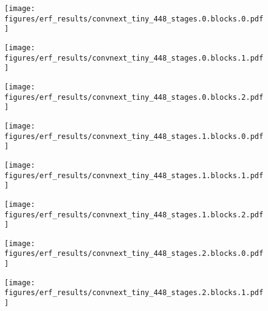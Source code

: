 \documentclass{article}
\begin{document}
\begin{figure}[tb]
  \raggedright
  \begin{minipage}[t]{0.13\hsize}
    \centering
    \texttt{[image: figures/erf\_results/convnext\_tiny\_448\_stages.0.blocks.0.pdf]}
    \label{figure:erf_convnext_448:0}
  \end{minipage}
  \begin{minipage}[t]{0.13\hsize}
    \centering
    \texttt{[image: figures/erf\_results/convnext\_tiny\_448\_stages.0.blocks.1.pdf]}
    \label{figure:erf_convnext_448:1}
  \end{minipage}
  \begin{minipage}[t]{0.13\hsize}
    \centering
    \texttt{[image: figures/erf\_results/convnext\_tiny\_448\_stages.0.blocks.2.pdf]}
    \label{figure:erf_convnext_448:2}
  \end{minipage}
  \begin{minipage}[t]{0.13\hsize}
    \centering
    \texttt{[image: figures/erf\_results/convnext\_tiny\_448\_stages.1.blocks.0.pdf]}
    \label{figure:erf_convnext_448:3}
  \end{minipage}
  \begin{minipage}[t]{0.13\hsize}
    \centering
    \texttt{[image: figures/erf\_results/convnext\_tiny\_448\_stages.1.blocks.1.pdf]}
    \label{figure:erf_convnext_448:4}
  \end{minipage}
  \begin{minipage}[t]{0.13\hsize}
    \centering
    \texttt{[image: figures/erf\_results/convnext\_tiny\_448\_stages.1.blocks.2.pdf]}
    \label{figure:erf_convnext_448:5}
  \end{minipage}
  \begin{minipage}[t]{0.13\hsize}
    \centering
    \texttt{[image: figures/erf\_results/convnext\_tiny\_448\_stages.2.blocks.0.pdf]}
    \label{figure:erf_convnext_448:6}
  \end{minipage}
  \begin{minipage}[t]{0.13\hsize}
    \centering
    \texttt{[image: figures/erf\_results/convnext\_tiny\_448\_stages.2.blocks.1.pdf]}
    \label{figure:erf_convnext_448:7}
  \end{minipage}
  \begin{minipage}[t]{0.13\hsize}

\end{minipage}
\end{figure}
\end{document}
